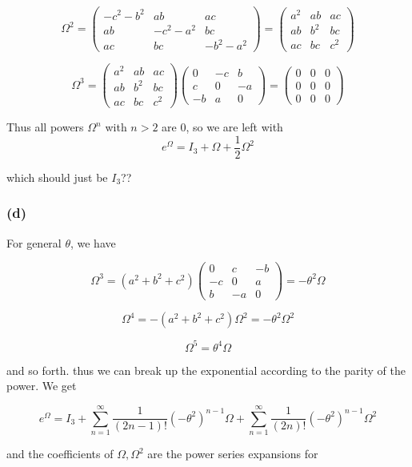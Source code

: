 \documentclass{article}
\begin{document}
\[ \Omega^2 = \left(\begin{array}{ccc} -c^2 - b^2 & ab & ac \\ ab & -c^2 - a^2 & bc \\ ac & bc & -b^2 - a^2 \end{array}\right) = \left(\begin{array}{ccc} a^2 & ab & ac \\ ab & b^2 & bc \\ ac & bc & c^2 \end{array}\right) \]

\[ \Omega^3 = \left(\begin{array}{ccc} a^2 & ab & ac \\ ab & b^2 & bc \\ ac & bc & c^2 \end{array}\right) \left(\begin{array}{ccc} 0 & -c & b \\ c & 0 & -a \\ -b & a & 0 \end{array}\right) = \left(\begin{array}{ccc} 0 & 0 & 0 \\ 0 & 0 & 0 \\ 0 & 0 & 0 \end{array}\right) \]

Thus all powers $\Omega^n$ with $n > 2$ are 0, so we are left with
\[ e^{\Omega} = I_3 + \Omega + \dfrac{1}{2} \Omega^2 \]

which should just be $I_3$??

\subsubsection{(d)} 

For general $\theta$, we have

\[\Omega^3 = (a^2 + b^2 + c^2) \left(\begin{array}{ccc} 0 & c & -b \\ -c & 0 & a \\ b & -a & 0 \end{array}\right) = -\theta^2 \Omega \]

\[\Omega^4 = -(a^2 + b^2 + c^2) \Omega^2 = -\theta^2 \Omega^2 \]

\[ \Omega^5 = \theta^4 \Omega\]

and so forth. thus we can break up the exponential according to the parity of the power. We get

\[e^{\Omega} = I_3 + \displaystyle\sum_{n=1}^{\infty} \dfrac{1}{(2n-1)!} (-\theta^2)^{n-1} \Omega + \displaystyle\sum_{n=1}^{\infty} \dfrac{1}{(2n)!} (-\theta^2)^{n-1} \Omega^2\]

and the coefficients of $\Omega, \Omega^2$ are the power series expansions for 
\end{document}
